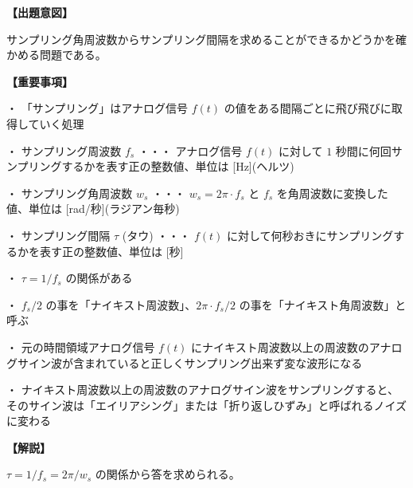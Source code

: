 \noindent \textbf{【出題意図】}

\noindent サンプリング角周波数からサンプリング間隔を求めることができるかどうかを確かめる問題である。

\vspace{1em}
\noindent \textbf{【重要事項】}

\medskip
\noindent ・ 「サンプリング」はアナログ信号 $f(t)$ の値をある間隔ごとに飛び飛びに取得していく処理

\medskip
\noindent ・ サンプリング周波数 $f_s$ ・・・ アナログ信号 $f(t)$ に対して $1$ 秒間に何回サンプリングするかを表す正の整数値、単位は [Hz](ヘルツ)

\medskip
\noindent ・ サンプリング角周波数 $w_s$ ・・・ $w_s = 2\pi\cdot f_s$ と $f_s$ を角周波数に変換した値、単位は [rad/秒](ラジアン毎秒)

\medskip
\noindent ・ サンプリング間隔 $\tau$ (タウ) ・・・ $f(t)$ に対して何秒おきにサンプリングするかを表す正の整数値、単位は [秒]

\medskip
\noindent ・ $\tau = 1/f_s$ の関係がある

\medskip
\noindent ・ $f_s/2$ の事を「ナイキスト周波数」、$2\pi \cdot f_s/2$ の事を「ナイキスト角周波数」と呼ぶ

\medskip
\noindent ・ 元の時間領域アナログ信号 $f(t)$ にナイキスト周波数以上の周波数のアナログサイン波が含まれていると正しくサンプリング出来ず変な波形になる

\medskip
\noindent ・ ナイキスト周波数以上の周波数のアナログサイン波をサンプリングすると、そのサイン波は「エイリアシング」または「折り返しひずみ」と呼ばれるノイズに変わる

\vspace{1em}
\noindent \textbf{【解説】}

\noindent $\tau = 1/f_s = 2\pi/w_s$ の関係から答を求められる。
